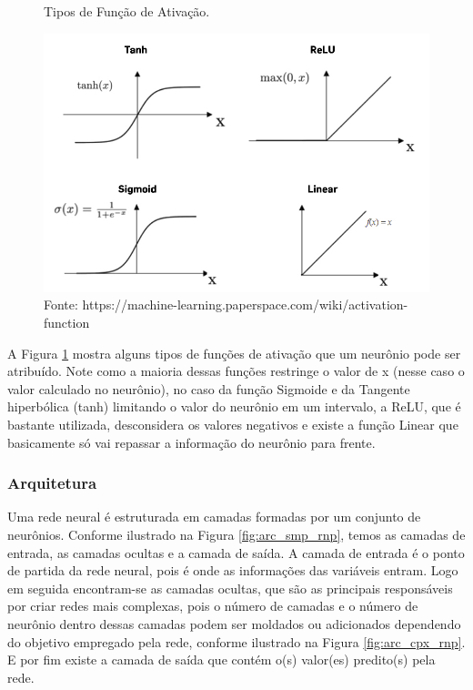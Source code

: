 \begin{figure}[H]
    \centering
    \caption{Tipos de Função de Ativação.}
    \includegraphics[scale=0.4]{imagens/activation-functions3.jpg}
    \caption*{Fonte: https://machine-learning.paperspace.com/wiki/activation-function}
    \label{fig:func_ativac}
    
\end{figure}

A Figura \ref{fig:func_ativac} mostra alguns tipos de funções de ativação que um neurônio pode ser atribuído. Note como a maioria dessas funções restringe o valor de x (nesse caso o valor calculado no neurônio), no caso da função Sigmoide e da Tangente hiperbólica (tanh) limitando o valor do neurônio em um intervalo, a ReLU, que é bastante utilizada, desconsidera os valores negativos e existe a função Linear que basicamente só vai repassar a informação do neurônio para frente.

\vspace{1cm}



\subsubsection{Arquitetura}

Uma rede neural é estruturada em camadas formadas por um conjunto de neurônios. Conforme ilustrado na Figura \ref{fig:arc_smp_rnp}, temos as camadas de entrada, as camadas ocultas e a camada de saída. A camada de entrada é o ponto de partida da rede neural, pois é onde as informações das variáveis entram. Logo em seguida encontram-se as camadas ocultas, que são as principais responsáveis por criar redes mais complexas, pois o número de camadas e o número de neurônio dentro dessas camadas podem ser moldados ou adicionados dependendo do objetivo empregado pela rede, conforme ilustrado na Figura \ref{fig:arc_cpx_rnp}. E por fim existe a camada de saída que contém o(s) valor(es) predito(s) pela rede.

